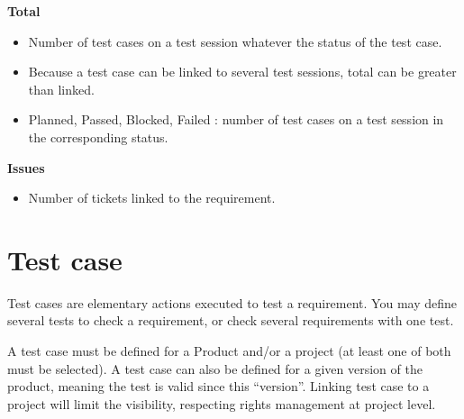 \documentclass[letterpaper,10pt,english]{sphinxmanual}
\begin{document}
{\begin{minipage}{0.95\linewidth}
\textbf{Total}
\begin{itemize}
\item {} 
Number of test cases on a test session whatever the status of the test case.

\item {} 
Because a test case can be linked to several test sessions, total can be greater than linked.

\item {} 
Planned, Passed, Blocked, Failed : number of test cases on a test session in the corresponding status.

\end{itemize}

\textbf{Issues}
\begin{itemize}
\item {} 
Number of tickets linked to the requirement.

\end{itemize}
\end{minipage}}
\begin{center}\setlength{\fboxsep}{5pt}\end{center}
\newpage
{}

\section{Test case}
\label{RequirementsTest:test-case}\label{RequirementsTest:index-1}
Test cases are elementary actions executed to test a requirement.
You may define several tests to check a requirement, or check several requirements with one test.

A test case must be defined for a Product and/or a project (at least one of both must be selected).
A test case can also be defined for a given version of the product, meaning the test is valid since this “version”.
Linking test case to a project will limit the visibility, respecting rights management at project level.
\end{document}
